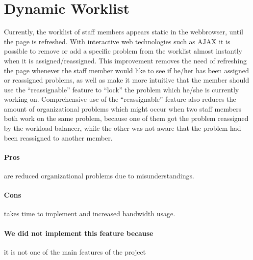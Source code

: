 \section{Dynamic Worklist}
\label{sec:dynamic_worklist}

Currently, the worklist of staff members appears static in the webbrowser, until the page is refreshed. With interactive web technologies such as AJAX it is possible to remove or add a specific problem from the worklist almost instantly when it is assigned/reassigned.
This improvement removes the need of refreshing the page whenever the staff member would like to see if he/her has been assigned or reassigned problems, as well as make it more intuitive that the member should use the ``reassignable'' feature to ``lock'' the problem which he/she is currently working on. Comprehensive use of the ``reassignable'' feature also reduces the amount of organizational problems which might occur when two staff members both work on the same problem, because one of them got the problem reassigned by the workload balancer, while the other was not aware that the problem had been reassigned to another member.

\paragraph{Pros} are reduced organizational problems due to misunderstandings. 
\paragraph{Cons} takes time to implement and increased bandwidth usage.
\paragraph{We did not implement this feature because} it is not one of the main features of the project
